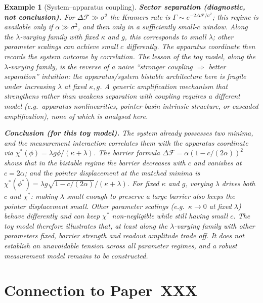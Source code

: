 \documentclass[12pt]{article}
\newtheorem{example}[theorem]{Example}
\newcommand{\Fcal}{\mathcal{F}}
\begin{document}
\begin{example}[System--apparatus coupling]
\textbf{Sector separation (diagnostic, not conclusion).} For $\Delta\Fcal \gg \sigma^2$ the Kramers rate is $\Gamma \sim e^{-2\Delta\Fcal/\sigma^2}$; this regime is available only if $\alpha \gg \sigma^2$, and then only in a sufficiently small-$c$ window. Along the $\lambda$-varying family with fixed $\kappa$ and $g$, this corresponds to small $\lambda$; other parameter scalings can achieve small $c$ differently. The apparatus coordinate then records the system outcome by correlation. The lesson of the toy model, along the $\lambda$-varying family, is the reverse of a naive ``stronger coupling $\Rightarrow$ better separation'' intuition: the apparatus/system bistable architecture here is fragile under increasing $\lambda$ at fixed $\kappa, g$. A generic amplification mechanism that strengthens rather than weakens separation with coupling requires a different model (e.g.\ apparatus nonlinearities, pointer-basin intrinsic structure, or cascaded amplification), none of which is analysed here.

\textbf{Conclusion (for this toy model).} The system already possesses two minima, and the measurement interaction correlates them with the apparatus coordinate via $\chi^*(\phi) = \lambda g\phi/(\kappa + \lambda)$. The barrier formula $\Delta\Fcal = \alpha(1 - c/(2\alpha))^2$ shows that in the bistable regime the barrier \emph{decreases} with $c$ and vanishes at $c = 2\alpha$; and the pointer displacement at the matched minima is $\chi^*(\phi^*) = \lambda g \sqrt{1 - c/(2\alpha)}/(\kappa+\lambda)$. For \emph{fixed $\kappa$ and $g$}, varying $\lambda$ drives both $c$ and $\chi^*$: making $\lambda$ small enough to preserve a large barrier also keeps the pointer displacement small. Other parameter scalings (e.g.\ $\kappa \to 0$ at fixed $\lambda$) behave differently and can keep $\chi^*$ non-negligible while still having small $c$. The toy model therefore illustrates that, at least along the $\lambda$-varying family with other parameters fixed, barrier strength and readout amplitude trade off. It does not establish an unavoidable tension across all parameter regimes, and a robust measurement model remains to be constructed.
\end{example}

\section{Connection to Paper~XXX}\label{sec:connection}
\end{document}
